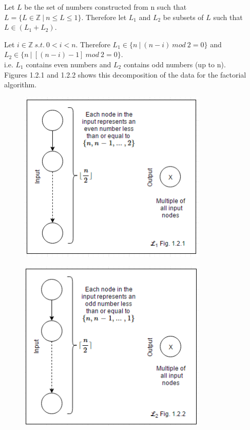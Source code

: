 \documentclass[11pt]{article}
\begin{document}
\begin{page}
\noindent Let $L$ be the set of numbers constructed from n such that $L = \{ L \in \mathbb{Z}\ |\ n \leq L \leq 1\}$.
Therefore let $L_1$ and $L_2$ be subsets of $L$ such that $L \in (L_1 + L_2) $.

\noindent Let $i \in \mathbb{Z} \ s.t. \ 0 < i < n$.
Therefore $L_1 \in \{ n\ |\ (n - i)\ mod \ 2 = 0 \}$ and $L_2 \in \{ n\ |\ [(n - i) - 1]\ mod \ 2 = 0 \}$.\\
\noindent i.e. $L_1$ contains even numbers and $L_2$ contains odd numbers (up to n).\\

\noindent Figures 1.2.1 and 1.2.2 shows this decomposition of the data for the factorial algorithm.\\

\begin{figure}[ht]
\centering
     \includegraphics[width=0.80\textwidth]{parallel_fig_1_2_1}
\end{figure}

\begin{figure}[ht]
\centering
     \includegraphics[width=0.80\textwidth]{parallel_fig_1_2_2}
\end{figure}\\


\end{page}
\end{document}
